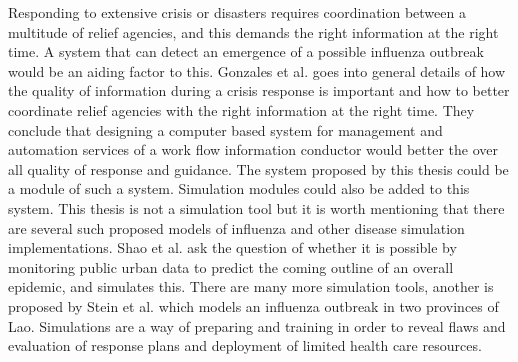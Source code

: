 Responding to extensive crisis or disasters requires coordination between a multitude of relief agencies, and this demands the right information at the right time. A system that can detect an emergence of a possible influenza outbreak would be an aiding factor to this. Gonzales et al. \cite{gonzalez2009framework} goes into general details of how the quality of information during a crisis response is important and how to better coordinate relief agencies with the right information at the right time. They conclude that designing a computer based system for management and automation services of a work flow information conductor would better the over all quality of response and guidance. The system proposed by this thesis could be a module of such a system. Simulation modules could also be added to this system. This thesis is not a simulation tool but it is worth mentioning that there are several such proposed models of influenza and other disease simulation implementations. Shao et al. \cite{shao2016forecasting} ask the question of whether it is possible by monitoring public urban data to predict the coming outline of an overall epidemic, and simulates this. There are many more simulation tools, another is proposed by Stein et al. \cite{stein2012development} which models an influenza outbreak in two provinces of Lao. Simulations are a way of preparing and training in order to reveal flaws and evaluation of response plans and deployment of limited health care resources.
